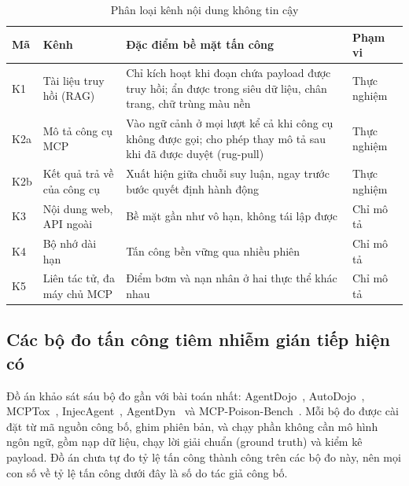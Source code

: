 \documentclass[../DoAn.tex]{subfiles}
\begin{document}
\begin{table}[htbp]
	\centering
	\caption{Phân loại kênh nội dung không tin cậy}
	\label{tab:kenh}
	\setlength{\tabcolsep}{3pt}
\begin{tabular}{|p{}|p{}|p{}|p{}|}
		\hline
		\textbf{Mã} & \textbf{Kênh} & \textbf{Đặc điểm bề mặt tấn công} & \textbf{Phạm vi} \\ \hline
		K1 & Tài liệu truy hồi (RAG) & Chỉ kích hoạt khi đoạn chứa payload được truy hồi; ẩn được trong siêu dữ liệu, chân trang, chữ trùng màu nền & Thực nghiệm \\ \hline
		K2a & Mô tả công cụ MCP & Vào ngữ cảnh ở mọi lượt kể cả khi công cụ không được gọi; cho phép thay mô tả sau khi đã được duyệt (rug-pull) & Thực nghiệm \\ \hline
		K2b & Kết quả trả về của công cụ & Xuất hiện giữa chuỗi suy luận, ngay trước bước quyết định hành động & Thực nghiệm \\ \hline
		K3 & Nội dung web, API ngoài & Bề mặt gần như vô hạn, không tái lập được & Chỉ mô tả \\ \hline
		K4 & Bộ nhớ dài hạn & Tấn công bền vững qua nhiều phiên & Chỉ mô tả \\ \hline
		K5 & Liên tác tử, đa máy chủ MCP & Điểm bơm và nạn nhân ở hai thực thể khác nhau & Chỉ mô tả \\ \hline
	\end{tabular}
\end{table}

\subsection{Các bộ đo tấn công tiêm nhiễm gián tiếp hiện có}
\label{subsection:2.1.3}

Đồ án khảo sát sáu bộ đo gần với bài toán nhất: AgentDojo~\cite{debenedetti2024agentdojo}, AutoDojo~\cite{ma2026autodojo}, MCPTox~\cite{wang2025mcptox}, InjecAgent~\cite{zhan2024injecagent}, AgentDyn~\cite{li2026agentdyn} và MCP-Poison-Bench~\cite{dewan2026mcppoison}. Mỗi bộ đo được cài đặt từ mã nguồn công bố, ghim phiên bản, và chạy phần không cần mô hình ngôn ngữ, gồm nạp dữ liệu, chạy lời giải chuẩn (ground truth) và kiểm kê payload. Đồ án chưa tự đo tỷ lệ tấn công thành công trên các bộ đo này, nên mọi con số về tỷ lệ tấn công dưới đây là số do tác giả công bố.
\end{document}
